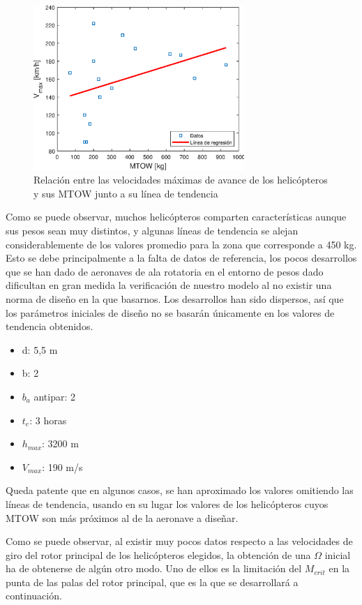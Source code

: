 \begin{figure}
	\centering
	\includegraphics[width=80mm]{graficos/analv}
	\caption{Relación entre las velocidades máximas de avance de los helicópteros y sus MTOW junto a su línea de tendencia}
	\label{vAS}
\end{figure}

Como se puede observar, muchos helicópteros comparten características aunque sus pesos sean muy distintos, y algunas líneas de tendencia se alejan considerablemente de los valores promedio para la zona que corresponde a 450 kg. Esto se debe principalmente a la falta de datos de referencia, los pocos desarrollos que se han dado de aeronaves de ala rotatoria en el entorno de pesos dado dificultan en gran medida la verificación de nuestro modelo al no existir una norma de diseño en la que basarnos. Los desarrollos han sido dispersos, así que los parámetros iniciales de diseño no se basarán únicamente en los valores de tendencia obtenidos.
 
\begin{itemize}
	\item d: 5,5 m
	\item b: 2
	\item $b_{a}$ antipar: 2
	\item $t_{e}$: 3 horas
	\item $h_{max}$: 3200 m
	\item $V_{max}$: 190 m/s
\end{itemize}

Queda patente que en algunos casos, se han aproximado los valores omitiendo las líneas de tendencia, usando en su lugar los valores de los helicópteros cuyos MTOW son más próximos al de la aeronave a diseñar.

Como se puede observar, al existir muy pocos datos respecto a las velocidades de giro del rotor principal de los helicópteros elegidos, la obtención de una $\Omega$ inicial ha de obtenerse de algún otro modo. Uno de ellos es la limitación del $M_{crit}$ en la punta de las palas del rotor principal, que es la que se desarrollará a continuación.

